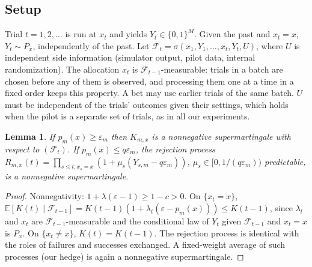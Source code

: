 \documentclass{article}
\newtheorem{lemma}{Lemma}
\newcommand{\eps}{\varepsilon}
\newcommand{\E}{\mathbb{E}}
\begin{document}
\subsection{Setup}
Trial $t=1,2,\dots$ is run at $x_t$ and yields $Y_t\in\{0,1\}^M$. Given the
past and $x_t=x$, $Y_t\sim P_x$, independently of the past. Let
$\mathcal F_t=\sigma(x_1,Y_1,\dots,x_t,Y_t,U)$, where $U$ is independent side
information (simulator output, pilot data, internal randomization). The
allocation $x_t$ is $\mathcal F_{t-1}$-measurable: trials in a batch are
chosen before any of them is observed, and processing them one at a time
in a fixed order keeps this property. A bet may use earlier trials of the
same batch. $U$ must be independent of the trials' outcomes given their
settings, which holds when the pilot is a separate set of trials, as in
all our experiments.

\begin{lemma}\label{lem:supermart}
If $p_m(x)\ge\eps_m$ then $K_{m,x}$ is a nonnegative supermartingale with
respect to $(\mathcal F_t)$. If $p_m(x)\le q\eps_m$, the rejection process
$R_{m,x}(t)=\prod_{s\le t:x_s=x}(1+\mu_s(Y_{s,m}-q\eps_m))$,
$\mu_s\in[0,1/(q\eps_m))$ predictable, is a nonnegative supermartingale.
\end{lemma}
\begin{proof}
Nonnegativity: $1+\lambda(\eps-1)\ge 1-c>0$. On $\{x_t=x\}$,
$\E[K(t)\mid\mathcal F_{t-1}] = K(t-1)(1+\lambda_t(\eps-p_m(x)))\le K(t-1)$,
since $\lambda_t$ and $x_t$ are $\mathcal F_{t-1}$-measurable and the
conditional law of $Y_t$ given $\mathcal F_{t-1}$ and $x_t=x$ is $P_x$. On
$\{x_t\ne x\}$, $K(t)=K(t-1)$. The rejection process is identical with the
roles of failures and successes exchanged. A fixed-weight average of such
processes (our hedge) is again a nonnegative supermartingale.
\end{proof}
\end{document}
